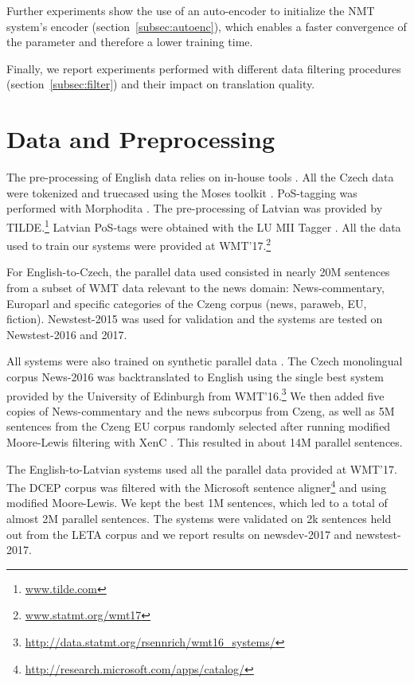 \documentclass[11pt,letterpaper,final]{article}
\begin{document}
Further experiments show the use of an auto-encoder to
initialize the NMT system's encoder (section~\ref{subsec:autoenc}), which enables a
faster convergence of the parameter and therefore a
lower training time.

Finally, we report experiments performed with
different data filtering procedures (section~\ref{subsec:filter})
and their impact on translation quality.


\section{Data and Preprocessing}
\label{subsec:data}

The pre-processing of English data relies on in-house
tools \cite{Dechelotte08limsi}. All the Czech data were tokenized and truecased 
using the Moses toolkit \cite{Koehn07moses}. PoS-tagging
was performed with Morphodita \cite{strakova14morphodita}.
The pre-processing of Latvian was provided by TILDE.\footnote{\url{www.tilde.com}}
Latvian PoS-tags were obtained with the LU MII Tagger \cite{paikens13lv}.
All the data used to train our systems were provided
at WMT'17.\footnote{\url{www.statmt.org/wmt17}} 

For English-to-Czech, the parallel data used consisted
in nearly 20M sentences from a subset of WMT data relevant
to the news domain: News-commentary, Europarl and specific
categories of the Czeng corpus (news, paraweb, EU, fiction).
Newstest-2015 was used for validation and the systems are
tested on Newstest-2016 and 2017. 

All systems were also trained on synthetic
parallel data \cite{sennrich16backtrans}.
The Czech monolingual corpus News-2016 was backtranslated to
English using the single best system provided by the University
of Edinburgh from WMT'16.\footnote{\url{http://data.statmt.org/rsennrich/wmt16_systems/}}
We then added five copies of News-commentary and the news subcorpus
from Czeng, as well as 5M sentences from the Czeng EU corpus randomly selected
after running modified Moore-Lewis filtering with XenC \cite{Rousseau13}.
This resulted in about 14M parallel sentences.

The English-to-Latvian systems used all the parallel data
provided at WMT'17. The DCEP corpus was filtered with the
Microsoft sentence aligner\footnote{\url{http://research.microsoft.com/apps/catalog/}}
and using modified Moore-Lewis. We kept the best 1M sentences, which led to
a total of almost 2M parallel sentences. The systems were validated
on 2k sentences held out from the LETA corpus and we
report results on newsdev-2017 and newstest-2017.
\end{document}
